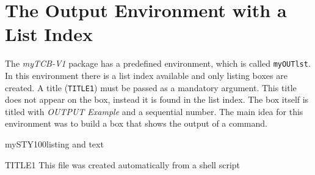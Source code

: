 \documentclass[]{myHOWTO-V001}
\begin{document}
%
%

\section{The Output Environment with a List Index}

The \emph{myTCB-V1} package has a predefined environment, which is called \Verb|myOUTlst|. In this environment there is a list index available and only listing boxes are created. A title (\verb|TITLE1|) must be passed as a mandatory argument. This title does not appear on the box, instead it is found in the list index. The box itself is titled with \emph{OUTPUT Example} and a sequential number. The main idea for this environment was to build a box that shows the output of a command.

\begin{myTEXEXdoclst}{mySTY100}{listing and text}
\begin{myOUTlst}{TITLE1}{}
This file was created automatically from
a shell script
\end{myOUTlst}
\end{myTEXEXdoclst}
\end{document}
